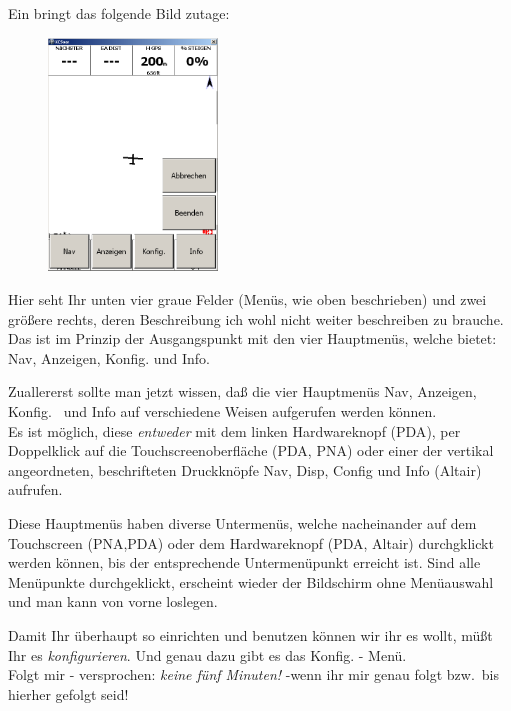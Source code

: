 Ein \dklick bringt das folgende Bild zutage:
\begin{figure}
\includegraphics[width=4.5cm]{Bilder/verysecond.png}
\end{figure}
Hier seht Ihr unten vier graue Felder (Menüs, wie  oben beschrieben) und zwei größere rechts, deren Beschreibung ich  wohl nicht weiter beschreiben zu brauche. Das ist im Prinzip der Ausgangspunkt mit den vier Hauptmenüs, welche \xc bietet: \textsf{Nav}, \textsf{Anzeigen},\textsf{ Konfig.} und \textsf{Info}.

Zuallererst sollte man jetzt wissen, daß die vier Hauptmenüs \textsf{Nav}, \textsf{Anzeigen}, \textsf{Konfig.\ } und \textsf{Info} auf verschiedene Weisen aufgerufen werden können.\\

Es ist möglich, diese  \textsl{entweder }mit dem linken Hardwareknopf (\textsf{PDA}), per Doppelklick auf die Touchscreenoberfläche (\textsf{\textsf{PDA, PNA}}) oder einer der vertikal angeordneten, beschrifteten Druckknöpfe \textsf{Nav}, \textsf{Disp}, \textsf{Config} und \textsf{Info} (\textsf{Altair}) aufrufen.

Diese Hauptmenüs haben diverse Untermenüs, welche nacheinander auf dem Touchscreen
(\textsf{PNA,PDA}) oder dem Hardwareknopf (\textsf{PDA, Altair}) durchgklickt werden
können, bis der entsprechende Untermenüpunkt erreicht ist. Sind alle Menüpunkte
durchgeklickt, erscheint wieder der Bildschirm ohne Menüauswahl und man kann von
vorne loslegen.

Damit Ihr  \xc  überhaupt so einrichten und benutzen können wir ihr es wollt, müßt Ihr es \textsl{konfigurieren}. Und genau dazu gibt es das \textsf{Konfig.} - Menü.\\[1em]

Folgt mir -  versprochen:  \textsl{keine fünf Minuten!} -wenn ihr mir genau folgt bzw.\ bis hierher gefolgt seid!
%
